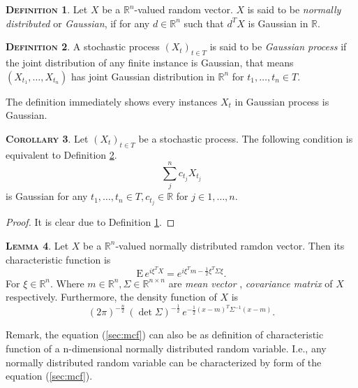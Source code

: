 \documentclass[a4paper, twoside, 11pt]{article}
\theoremstyle{definition}
\newtheorem{definition}{\scshape Definition}[section]
\newtheorem{lemma}[definition]{\scshape Lemma}
\newtheorem{corollary}[definition]{\scshape Corollary}
\begin{document}
\begin{definition}
  Let $X$ be a $\mathbb{R}^{n}$-valued random vector. $X$ is said to be \emph{normally distributed} or \emph{Gaussian}, if for any $d \in \mathbb{R}^{n}$ such that $d^TX$ is Gaussian in $\mathbb{R}$.
  \label{sec:g1}
\end{definition}

\begin{definition}
  A stochastic process $(X_t)_{t\in T}$ is said to be \emph{Gaussian process} if the joint distribution of any finite instance is Gaussian, that means
$
(X_{t_1},\dots, X_{t_n})
$ has joint Gaussian distribution in $\mathbb{R}^n$ for $t_1,\dots,t_n \in T$.
\label{sec:defgau}
\end{definition}
The definition immediately shows every instances $X_t$ in Gaussian process is Gaussian.

\begin{corollary}
  Let $(X_t)_{t\in T}$ be a stochastic process. The following condition is equivalent to Definition \ref{sec:defgau}.
  \begin{equation*}
	\sum_j^n c_{t_j} X_{t_j}
  \end{equation*}
  is Gaussian for any $t_1,\dots,t_n \in T, c_{t_j} \in \mathbb{R}$ for $j\in {1,\dots,n}$.
  \label{sec:gauss}
\end{corollary}
\begin{proof}
  It is clear due to Definition \ref{sec:g1}.
\end{proof}

\begin{lemma}
  Let $X$ be a $\mathbb{R}^{n}$-valued normally distributed ramdon vector. Then its characteristic function is 
  \begin{equation}
	\mathrm{E}\,e^{i\xi^TX} = e^{i\xi^Tm - \frac{1}{2}\xi^T \Sigma \xi}.
	\label{sec:mcf}
  \end{equation}
 For $\xi \in \mathbb{R}^{n}$. Where $m \in \mathbb{R}^{n}, \Sigma \in \mathbb{R}^{n\times n}$ are \emph{mean vector} , \emph{covariance matrix} of $X$ respectively. Furthermore, the density function of $X$ is
\begin{equation}
  (2\pi)^{-\frac{n}{2}}\, (\det\Sigma) ^{-\frac{1}{2}}\,e^{-\frac{1}{2}(x-m)^T\Sigma^{-1}(x-m)}.
  \label{sec:dsy}
\end{equation}
\end{lemma}

Remark, the equation (\ref{sec:mcf}) can also be as definition of characteristic function of a n-dimensional normally distributed random variable. I.e., any normally distributed random variable can be characterized by form of the equation (\ref{sec:mcf}).
\end{document}
